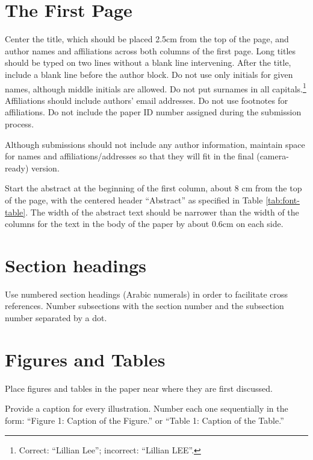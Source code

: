 \documentclass[11pt,a4paper]{article}
\begin{document}
\section{The First Page}
\label{ssec:first}

Center the title, which should be placed 2.5cm from the top of the page,
\iftaclpubformat
and author names and affiliations
\fi
across both columns of the first page. Long titles should be typed on two lines
without a blank line intervening.
\iftaclpubformat
After the title, include a blank line before the author block.
Do not use only initials for given names, although middle initials are allowed.
Do not put surnames in all capitals.\footnote{Correct: ``Lillian Lee'';
incorrect: ``Lillian LEE''.} Affiliations should include authors' email
addresses. Do not use footnotes for affiliations.
\else
Do not include the paper ID number assigned during the submission process.
\fi

\iftaclpubformat
\else
Although submissions should not include any author information, maintain space
for names and affiliations/addresses so that they will fit in the final
(camera-ready)
version.
\fi


Start the abstract at the beginning of the first
column, about 8 cm from the top of the page, with the centered header
``Abstract'' as specified in Table \ref{tab:font-table}.
The width of the abstract text
should be narrower than the width of the columns for the text in the body of the
paper by about 0.6cm on each side.

\section{Section headings}

Use numbered section headings (Arabic numerals) in order to facilitate cross
references. Number subsections with the section number and the subsection number
separated by a dot.



\section{Figures and Tables}

Place figures and tables in the paper near where they are first discussed.

Provide a caption for every illustration. Number each one
sequentially in the form:  ``Figure 1: Caption of the Figure.'' or ``Table 1:
Caption of the Table.''
\end{document}

